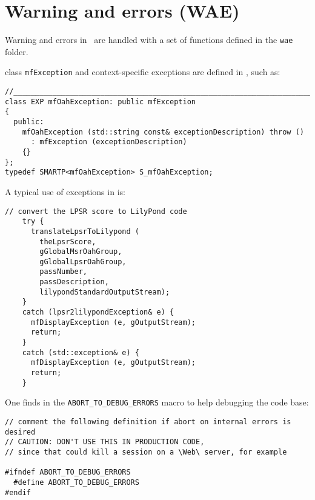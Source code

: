 
\chapter{Warning and errors (WAE)}


Warning and errors in \mf\ are handled with a set of functions defined in the {\tt wae} folder.

class   {\tt mfException} and context-specific exceptions are defined in , such as:
\begin{lstlisting}[language=CPlusPlus]
//______________________________________________________________________________
class EXP mfOahException: public mfException
{
  public:
    mfOahException (std::string const& exceptionDescription) throw ()
      : mfException (exceptionDescription)
    {}
};
typedef SMARTP<mfOahException> S_mfOahException;
\end{lstlisting}

A typical use of exceptions in  is:
\begin{lstlisting}[language=CPlusPlus]
    // convert the LPSR score to LilyPond code
    try {
      translateLpsrToLilypond (
        theLpsrScore,
        gGlobalMsrOahGroup,
        gGlobalLpsrOahGroup,
        passNumber,
        passDescription,
        lilypondStandardOutputStream);
    }
    catch (lpsr2lilypondException& e) {
      mfDisplayException (e, gOutputStream);
      return;
    }
    catch (std::exception& e) {
      mfDisplayException (e, gOutputStream);
      return;
    }
\end{lstlisting}


One finds in  the {\tt ABORT_TO_DEBUG_ERRORS} macro to help debugging the code base:
\begin{lstlisting}[language=CPlusPlus]
// comment the following definition if abort on internal errors is desired
// CAUTION: DON'T USE THIS IN PRODUCTION CODE,
// since that could kill a session on a \Web\ server, for example

#ifndef ABORT_TO_DEBUG_ERRORS
  #define ABORT_TO_DEBUG_ERRORS
#endif
\end{lstlisting}
